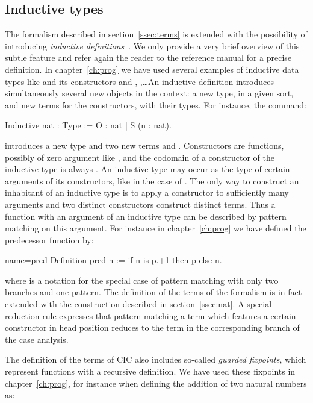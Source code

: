\subsection{Inductive types}\label{ssec:indtypes}

The formalism described in section~\ref{ssec:terms} is extended with
the possibility of introducing
\emph{inductive definitions}~\cite{CoPa89, Moh93}. We only provide a
very brief overview of this subtle feature and refer again the reader
to the reference manual for a precise definition.
In chapter~\ref{ch:prog} we have used several examples of inductive
data types like  and its constructors  and ,
,\ldots An inductive definition introduces simultaneously
several new objects in the context: a new type, in a given sort, and
new terms for the constructors, with their types. For instance, the
command:

\begin{coq}{}{}
Inductive nat : Type := O : nat | S (n : nat).
\end{coq}
introduces a new type  and two new terms  and
. Constructors are functions, possibly of zero
argument like , and the codomain of a constructor of the
inductive type  is always . An inductive type may occur as
the type of certain arguments of its constructors, like in the case of
. The only way to construct an inhabitant of an
inductive type is to apply a constructor to sufficiently many
arguments and two distinct constructors construct distinct
terms. Thus a function with an argument of an inductive type can be
described by pattern matching on this argument. For instance in
chapter~\ref{ch:prog} we have defined the predecessor function by:

\begin{coq}{name=pred}{}
Definition pred n := if n is p.+1 then p else n.
\end{coq}
where  is a notation for the special case of
pattern matching with only two branches and one pattern. The definition of
the terms of the formalism is in fact extended with the
 construction described in
section~\ref{ssec:nat}. A special reduction rule expresses that
pattern matching a term which features a certain constructor in head
position reduces to the term in the corresponding branch of the case
analysis.

The definition of the terms of CIC also includes so-called
\emph{guarded fixpoints}, which represent functions with a recursive
definition. We have used these fixpoints in chapter~\ref{ch:prog}, for
instance when defining the addition of two natural numbers as:

